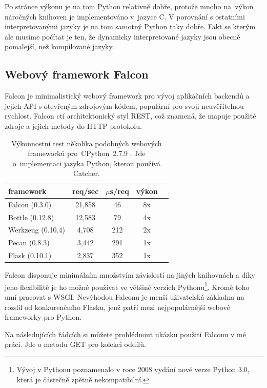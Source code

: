 Po stránce výkonu je na tom Python relativně dobře, protože mnoho na~výkon náročných knihoven je implementováno v~jazyce C.
V porovnání s ostatními interpretovanými jazyky je na tom samotný Python taky dobře.
Fakt se kterým ale musíme počítat je ten, že dynamicky interpretované jazyky jsou obecně pomalejší, než kompilované jazyky.

\subsection{Webový framework Falcon}

Falcon\cite{falcon} je minimalistický webový framework pro vývoj aplikačních backendů a jejich API s otevřeným zdrojovým kódem,
populární pro svoji neuvěřitelnou rychlost. Falcon ctí architektonický styl REST, což znamená, že mapuje použité
zdroje a jejich metody do HTTP protokolu.

\begin{table}[htb]
 \centering
 \begin{tabular}{|l||c|c|c|c|}\hline
 \bfseries \bfseries framework & \bfseries req/sec & \bfseries $\mu$s/req & \bfseries výkon \\[2mm]
 \hline
 Falcon (0.3.0) & 21,858 & 46 & 8x \\
 \hline
 Bottle (0.12.8) & 12,583 & 79 & 4x \\
 \hline
 Werkzeug (0.10.4) & 4,708 & 212 & 2x \\
 \hline
 Pecan (0.8.3) & 3,442 & 291 & 1x \\
 \hline
 Flask (0.10.1) & 2,837 & 352 & 1x \\
 \hline
 \end{tabular}
 \caption{Výkonnostní test několika podobných webových frameworků pro~CPython~2.7.9 \cite{falcon-benchmarks}.
 Jde o~implementaci jazyka Python, kterou používá Catcher.}
\end{table}

Falcon disponuje minimálním množstvím závislostí na jiných knihovnách a díky jeho flexibilitě je ho možné
používat ve většině verzích Pythonu\footnote{Vývoj v Pythonu poznamenalo v roce 2008 vydání nové verze Python 3.0,
která je částečně zpětně nekompatibilní.}. Kromě toho umí pracovat s WSGI. Nevýhodou Falconu je menší uživatelská
základna na rozdíl od konkurenčního Flasku, jenž patří mezi nejpopulárnější webové frameworky pro Python.

Na následujících řádcích si můžete prohlédnout ukázku použití Falconu v mé práci. Jde o metodu GET pro kolekci oddílů.

